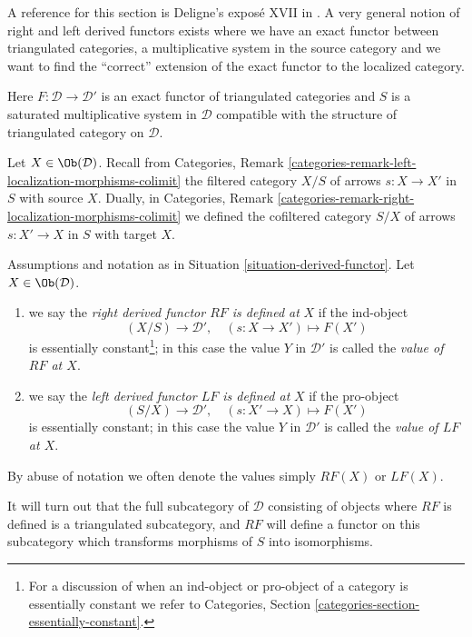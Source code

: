 \noindent
A reference for this section is Deligne's expos\'e XVII in \cite{SGA4}.
A very general notion of right and left derived functors exists where
we have an exact functor between triangulated categories, a multiplicative
system in the source category and we want to find the ``correct'' extension
of the exact functor to the localized category.

\begin{situation}
\label{situation-derived-functor}
Here $F : \mathcal{D} \to \mathcal{D}'$ is an exact functor of triangulated
categories and $S$ is a saturated multiplicative
system in $\mathcal{D}$ compatible with the structure
of triangulated category on $\mathcal{D}$.
\end{situation}

\noindent
Let $X \in \Ob(\mathcal{D})$. Recall from
Categories, Remark \ref{categories-remark-left-localization-morphisms-colimit}
the filtered category $X/S$ of arrows $s : X \to X'$ in $S$ with source $X$.
Dually, in
Categories, Remark \ref{categories-remark-right-localization-morphisms-colimit}
we defined the cofiltered category $S/X$ of arrows $s : X' \to X$ in $S$
with target $X$.

\begin{definition}
\label{definition-right-derived-functor-defined}
Assumptions and notation as in
Situation \ref{situation-derived-functor}.
Let $X \in \Ob(\mathcal{D})$.
\begin{enumerate}
\item we say the {\it right derived functor $RF$ is defined at}
$X$ if the ind-object
$$
(X/S) \longrightarrow \mathcal{D}', \quad
(s : X \to X') \longmapsto F(X')
$$
is essentially constant\footnote{For a discussion of when an ind-object
or pro-object of a category is essentially constant we refer to
Categories, Section \ref{categories-section-essentially-constant}.};
in this case the value
$Y$ in $\mathcal{D}'$ is called the {\it value of $RF$ at $X$}.
\item we say the {\it left derived functor $LF$ is defined at} $X$
if the pro-object
$$
(S/X) \longrightarrow \mathcal{D}', \quad
(s: X' \to X) \longmapsto F(X')
$$
is essentially constant; in this case the value $Y$ in $\mathcal{D}'$
is called the {\it value of $LF$ at $X$}.
\end{enumerate}
By abuse of notation we often denote the values simply
$RF(X)$ or $LF(X)$.
\end{definition}

\noindent
It will turn out that the full subcategory of $\mathcal{D}$ consisting
of objects where $RF$ is defined is a triangulated subcategory, and
$RF$ will define a functor on this subcategory which transforms morphisms
of $S$ into isomorphisms.

